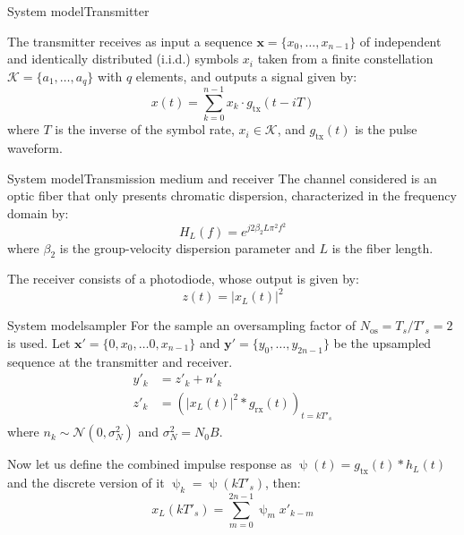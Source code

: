 \documentclass[en]{sdqbeamer}
\begin{document}
\begin{frame}{System model}{Transmitter}

The transmitter receives as input a sequence $\bm x=\{x_0,\dotsc,x_{n-1}\}$ of independent and identically distributed (i.i.d.) symbols $x_i$ taken from a finite constellation $\mathcal K=\{a_1,\dotsc,a_q\}$ with $q$ elements, and outputs a signal given by:%
\begin{equation}
x(t)=\sum_{k=0}^{n-1}x_k\cdot g_\text{tx}(t-iT)
\label{eq:Plabst_signaling_block}
\end{equation}
where $T$ is the inverse of the symbol rate, $x_i\in\mathcal K$, and $g_\text{tx}(t)$ is the pulse waveform.

\end{frame}

\begin{frame}{System model}{Transmission medium and receiver}
The channel considered is an optic fiber that only presents chromatic dispersion, characterized in the frequency domain by:
\begin{equation}
H_L(f)=e^{j2\beta_2L\pi^2f^2}
\end{equation}
where $\beta_2$ is the group-velocity dispersion parameter and $L$ is the fiber length.

The receiver consists of a photodiode, whose output is given by:
\begin{equation}
z(t)=|x_L(t)|^2
\end{equation}

\end{frame}


\begin{frame}{System model}{sampler}
For the sample an oversampling factor of $N_\text{os}=T_s/T'_s=2$ is used. Let $\bm x'=\{0,x_0,\dotsc0,x_{n-1}\}$ and $\bm y'=\{y_0,\dotsc,y_{2n-1}\}$ be the upsampled sequence at the transmitter and receiver.
\begin{align}
y'_k&=z'_k+n'_k \\
z'_k&=\left(|x_L(t)|^2*g_\text{rx}(t)\right)_{t=kT'_s}
\end{align}
where $n_k\sim\mathcal N(0,\sigma_N^2)$ and $\sigma_N^2=N_0B$.

Now let us define the combined impulse response as $\uppsi(t)=g_\text{tx}(t)*h_L(t)$ and the discrete version of it $\uppsi_k=\uppsi(kT'_s)$, then:
\begin{equation}
x_L(kT'_s)=\sum_{m=0}^{2n-1}\uppsi_mx'_{k-m}
\end{equation}


\end{frame}
\end{document}

